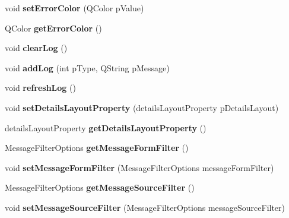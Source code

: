 \begin{DoxyCompactItemize}
\item 
\hypertarget{classQELog_a4848bc1ff1fd76a40c16cba3048902dd}{
void {\bfseries setErrorColor} (QColor pValue)}
\label{classQELog_a4848bc1ff1fd76a40c16cba3048902dd}

\item 
\hypertarget{classQELog_a74203f1bf43dc7ec900cd3d9c86e116f}{
QColor {\bfseries getErrorColor} ()}
\label{classQELog_a74203f1bf43dc7ec900cd3d9c86e116f}

\item 
\hypertarget{classQELog_affdc407f650d6ff293c1846f393f6fcf}{
void {\bfseries clearLog} ()}
\label{classQELog_affdc407f650d6ff293c1846f393f6fcf}

\item 
\hypertarget{classQELog_a2ae53a6c4421682bc2402f41cf99a68f}{
void {\bfseries addLog} (int pType, QString pMessage)}
\label{classQELog_a2ae53a6c4421682bc2402f41cf99a68f}

\item 
\hypertarget{classQELog_a69a3dd36bc19a839367d5b9bcc307c53}{
void {\bfseries refreshLog} ()}
\label{classQELog_a69a3dd36bc19a839367d5b9bcc307c53}

\item 
\hypertarget{classQELog_a7c3c8ff38b8597693761bd5f6c61d1a5}{
void {\bfseries setDetailsLayoutProperty} (detailsLayoutProperty pDetailsLayout)}
\label{classQELog_a7c3c8ff38b8597693761bd5f6c61d1a5}

\item 
\hypertarget{classQELog_ac4bf3c55033e43e97eeb2b57af37c010}{
detailsLayoutProperty {\bfseries getDetailsLayoutProperty} ()}
\label{classQELog_ac4bf3c55033e43e97eeb2b57af37c010}

\item 
\hypertarget{classQELog_aed7337e1e608fc3a3c9f1f6c16d07419}{
MessageFilterOptions {\bfseries getMessageFormFilter} ()}
\label{classQELog_aed7337e1e608fc3a3c9f1f6c16d07419}

\item 
\hypertarget{classQELog_a4960709b235e912483140369a40fc076}{
void {\bfseries setMessageFormFilter} (MessageFilterOptions messageFormFilter)}
\label{classQELog_a4960709b235e912483140369a40fc076}

\item 
\hypertarget{classQELog_a6072239eb36c73492dc8456a1fbddca5}{
MessageFilterOptions {\bfseries getMessageSourceFilter} ()}
\label{classQELog_a6072239eb36c73492dc8456a1fbddca5}

\item 
\hypertarget{classQELog_ab2a7190148ef19a798589eafbd00b1a1}{
void {\bfseries setMessageSourceFilter} (MessageFilterOptions messageSourceFilter)}
\label{classQELog_ab2a7190148ef19a798589eafbd00b1a1}

\end{DoxyCompactItemize}
